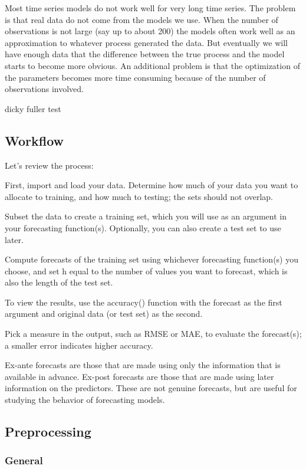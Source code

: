 \documentclass[]{book}
\begin{document}
Most time series models do not work well for very long time series. The problem is that real data do not come from the models we use. When the number of observations is not large (say up to about 200) the models often work well as an approximation to whatever process generated the data. But eventually we will have enough data that the difference between the true process and the model starts to become more obvious. An additional problem is that the optimization of the parameters becomes more time consuming because of the number of observations involved.

dicky fuller test

\hypertarget{workflow-1}{%
\subsection{Workflow}\label{workflow-1}}

Let's review the process:

First, import and load your data. Determine how much of your data you want to allocate to training, and how much to testing; the sets should not overlap.

Subset the data to create a training set, which you will use as an argument in your forecasting function(s). Optionally, you can also create a test set to use later.

Compute forecasts of the training set using whichever forecasting function(s) you choose, and set h equal to the number of values you want to forecast, which is also the length of the test set.

To view the results, use the accuracy() function with the forecast as the first argument and original data (or test set) as the second.

Pick a measure in the output, such as RMSE or MAE, to evaluate the forecast(s); a smaller error indicates higher accuracy.

Ex-ante forecasts are those that are made using only the information that is available in advance. Ex-post forecasts are those that are made using later information on the predictors. These are not genuine forecasts, but are useful for studying the behavior of forecasting models.

\hypertarget{preprocessing}{%
\subsection{Preprocessing}\label{preprocessing}}

\hypertarget{general-4}{%
\subsubsection{General}\label{general-4}}
\end{document}
